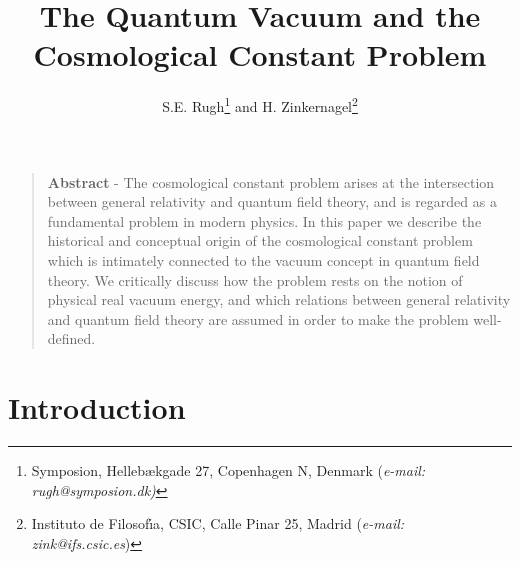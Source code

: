 \documentclass[12pt]{article}
\begin{document}
 

\title{{\sc The Quantum Vacuum and the Cosmological Constant Problem}}
\author{
{\sc S.E. Rugh\thanks{Symposion, Helleb\ae kgade 27, Copenhagen N, Denmark
({\em e-mail: rugh@symposion.dk)}} and  H.  
Zinkernagel\thanks{Instituto de Filosof\'\i a, CSIC, 
Calle Pinar 25, Madrid ({\em e-mail: zink@ifs.csic.es})}}  }
\date{}
\maketitle


\begin{quotation}
\noindent
\small
{\bf Abstract} - The cosmological constant problem arises at the
intersection between general relativity and quantum field theory,
and is regarded as a fundamental problem in modern physics. In
this paper we describe the historical and conceptual origin of the
cosmological constant problem which is intimately connected to the
vacuum concept in quantum field theory. We critically discuss how
the problem rests on the notion of physical real vacuum energy,
and which relations between general relativity and quantum field
theory are assumed in order to make the problem well-defined.
\end{quotation} 

\normalsize
\newpage

\section{Introduction}
\end{document}
